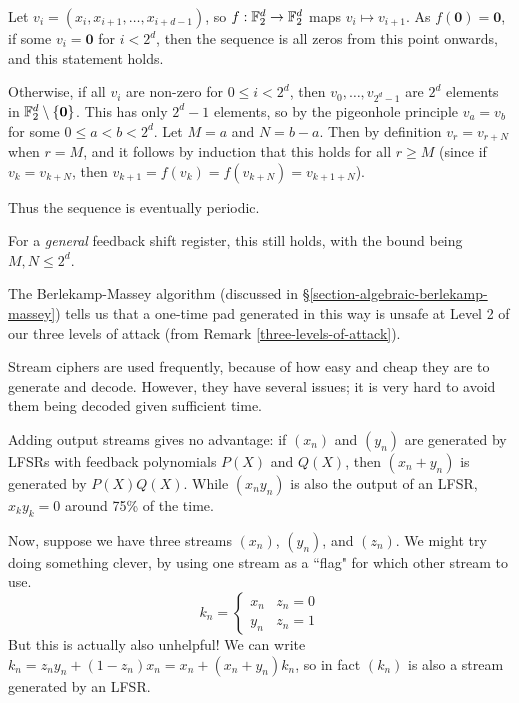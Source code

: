 \documentclass{article}
\begin{document}
\begin{prf}
    Let $v_i = (x_i, x_{i+1}, \dots, x_{i+d-1})$, so $f: \mathbb{F}_2^d \to \mathbb{F}_2^d$ maps $v_i \mapsto v_{i+1}$. As $f(\mathbf 0) = \mathbf 0$, if some $v_i = \mathbf 0$ for $i < 2^d$, then the sequence is all zeros from this point onwards, and this statement holds.
    
    Otherwise, if all $v_i$ are non-zero for $0 \leq i < 2^d$, then $v_0, \dots, v_{2^d-1}$ are $2^d$ elements in $\mathbb{F}_2^d \setminus \left\lbrace \mathbf 0 \right\rbrace$. This has only $2^d - 1$ elements, so by the pigeonhole principle $v_a = v_b$ for some $0 \leq a < b < 2^d$. Let $M = a$ and $N = b-a$. Then by definition $v_r = v_{r+N}$ when $r = M$, and it follows by induction that this holds for all $r \geq M$ (since if $v_k = v_{k+N}$, then $v_{k+1} = f(v_k) = f(v_{k+N}) = v_{k+1+N}$).
    
    Thus the sequence is eventually periodic.
\end{prf}

\begin{corollary}
    For a \textit{general} feedback shift register, this still holds, with the bound being $M, N \leq 2^d$.
\end{corollary}

\begin{note}
	The Berlekamp-Massey algorithm (discussed in \S\ref{section-algebraic-berlekamp-massey}) tells us that a one-time pad generated in this way is unsafe at Level 2 of our three levels of attack (from Remark \ref{three-levels-of-attack}).
\end{note}

Stream ciphers are used frequently, because of how easy and cheap they are to generate and decode. However, they have several issues; it is very hard to avoid them being decoded given sufficient time.

Adding output streams gives no advantage: if $(x_n)$ and $(y_n)$ are generated by LFSRs with feedback polynomials $P(X)$ and $Q(X)$, then $(x_n + y_n)$ is generated by $P(X)Q(X)$. While $(x_ny_n)$ is also the output of an LFSR, $x_ky_k = 0$ around 75\% of the time.

Now, suppose we have three streams $(x_n)$, $(y_n)$, and $(z_n)$. We might try doing something clever, by using one stream as a ``flag" for which other stream to use.
\[
k_n = \begin{cases}
	x_n & z_n = 0 \\
	y_n & z_n = 1
\end{cases}
\]
But this is actually also unhelpful! We can write $k_n = z_ny_n + (1-z_n)x_n = x_n + (x_n + y_n)k_n$, so in fact $(k_n)$ is also a stream generated by an LFSR.
\end{document}
